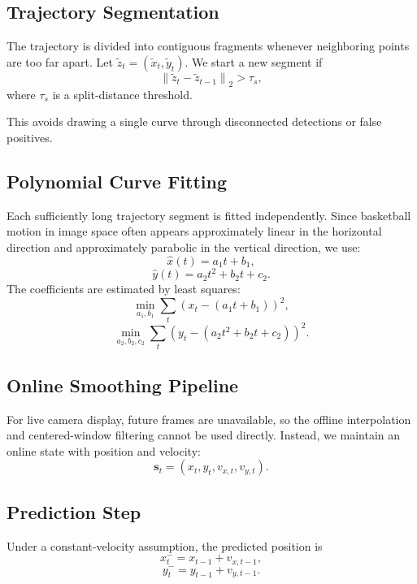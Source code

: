 \documentclass[11pt]{article}
\begin{document}
\subsection{Trajectory Segmentation}
The trajectory is divided into contiguous fragments whenever neighboring points are too far apart. Let $\tilde{z}_t = (\tilde{x}_t, \tilde{y}_t)$. We start a new segment if
\begin{equation}
    \left\| \tilde{z}_t - \tilde{z}_{t-1} \right\|_2 > \tau_s,
\end{equation}
where $\tau_s$ is a split-distance threshold.

This avoids drawing a single curve through disconnected detections or false positives.

\subsection{Polynomial Curve Fitting}
Each sufficiently long trajectory segment is fitted independently. Since basketball motion in image space often appears approximately linear in the horizontal direction and approximately parabolic in the vertical direction, we use:
\begin{equation}
    \hat{x}(t) = a_1 t + b_1,
\end{equation}
\begin{equation}
    \hat{y}(t) = a_2 t^2 + b_2 t + c_2.
\end{equation}
The coefficients are estimated by least squares:
\begin{equation}
    \min_{a_1,b_1} \sum_t \left(x_t - (a_1 t + b_1)\right)^2,
\end{equation}
\begin{equation}
    \min_{a_2,b_2,c_2} \sum_t \left(y_t - (a_2 t^2 + b_2 t + c_2)\right)^2.
\end{equation}

\subsection{Online Smoothing Pipeline}
For live camera display, future frames are unavailable, so the offline interpolation and centered-window filtering cannot be used directly. Instead, we maintain an online state with position and velocity:
\begin{equation}
    \bm{s}_t = (x_t, y_t, v_{x,t}, v_{y,t}).
\end{equation}

\subsection{Prediction Step}
Under a constant-velocity assumption, the predicted position is
\begin{equation}
    x_t^- = x_{t-1} + v_{x,t-1},
\end{equation}
\begin{equation}
    y_t^- = y_{t-1} + v_{y,t-1}.
\end{equation}
\end{document}
